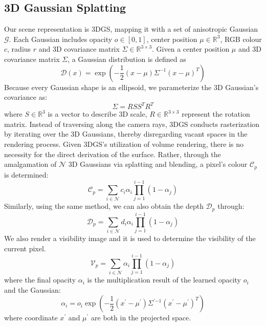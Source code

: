 \documentclass[lettersize,journal]{IEEEtran}
\begin{document}
\subsection{3D Gaussian Splatting}
Our scene representation is 3DGS, mapping it with a set of anisotropic Gaussian $\mathcal{G}$. Each Gaussian includes opacity $o\in[0,1]$, center position $\mu\in\mathbb{R}^3$, RGB colour $c$, radius $r$ and 3D covariance matrix $\Sigma\in\mathbb{R}^{3\times3}$.
Given a center position $\mu$ and 3D covariance matrix $\Sigma$, a Gaussian distribution is defined as 
\begin{equation}
\mathcal{D}(x)= \exp(-\frac{1}{2}(x-\mu)\Sigma^{-1}(x-\mu)^{T})
\label{eq:Dx}
\end{equation}
Because every Gaussian shape is an ellipsoid, we parameterize the 3D Gaussian’s covariance as:
\begin{equation}
\Sigma = RSS^TR^T
\label{eq:Sigma}
\end{equation}
where $S\in\mathbb{R}^3$ is a vector to describe 3D scale, $R\in\mathbb{R}^{3\times3}$ represent the rotation matrix. Instead of traversing along the camera rays, 3DGS conducts rasterization by iterating over the 3D Gaussians, thereby disregarding vacant spaces in the rendering process. Given 3DGS's utilization of volume rendering, there is no necessity for the direct derivation of the surface. Rather, through the amalgamation of $\mathcal{N}$ 3D Gaussians via splatting and blending, a pixel's colour $\mathcal{C}_{p}$ is determined:
\begin{equation}
\mathcal{C}_p=\sum_{i\in{\mathcal{N}}}{c}_{i}{\alpha}_{i}\prod_{j=1}^{i-1}(1-{\alpha}_{j})
\label{eq:Cp}
\end{equation}
Similarly, using the same method, we can also obtain the depth $\mathcal{D}_{p}$ through:
\begin{equation}
\mathcal{D}_p=\sum_{i\in{\mathcal{N}}}{d}_{i}{\alpha}_{i}\prod_{j=1}^{i-1}(1-{\alpha}_{j})
\label{eq:Dp}
\end{equation}
We also render a visibility image and it is used to determine the visibility of the current pixel.
\begin{equation}
\mathcal{V}_p=\sum_{i\in{\mathcal{N}}}{\alpha}_{i}\prod_{j=1}^{i-1}(1-{\alpha}_{j})
\label{eq:Vp}
\end{equation}
where the final opacity $\alpha_i$ is the multiplication result of the learned opacity $o_i$ and the Gaussian:
\begin{equation}
\mathcal{\alpha}_i= o_i\exp(-\frac{1}{2}(x^\prime-\mu^\prime)\Sigma^{\prime{-1}}(x^\prime-\mu^\prime)^{T})
\label{eq:alpha}
\end{equation}
where coordinate $x^\prime$ and $\mu^\prime$ are both in the projected space.
\end{document}
